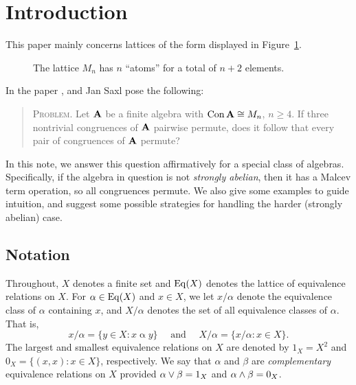 \section{Introduction}
This paper mainly concerns lattices of the form displayed in Figure~\ref{fig:Mn}.
\begin{figure}[!h]
  \caption{The lattice $M_n$ has $n$ ``atoms'' for a total of $n+2$ elements.}
  \label{fig:Mn}
\end{figure}
In the paper \cite{PalfySaxl}, \Peter \Palfy and Jan Saxl pose 
the following: 
\begin{quote}
  {\scshape Problem.}
  Let $\mathbf{A}$ be a finite algebra with $\operatorname{Con} \mathbf{A} \cong M_n$, $n\geq
  4$. If three nontrivial congruences of $\mathbf{A}$ pairwise permute, does it follow
  that every pair of congruences of $\mathbf{A}$ permute?
\end{quote}
In this note, we answer this question affirmatively for a special class of
algebras. 
Specifically, if the algebra in question is not \emph{strongly abelian}, then it has a 
Malcev term operation, so all congruences permute.  
We also give some examples to guide intuition, and suggest some 
possible strategies for handling the harder (strongly abelian) case. 

\subsection{Notation}
Throughout, $X$ denotes a finite set and $\operatorname{Eq}(X)$ denotes the lattice of
equivalence relations on $X$. For $\alpha \in \operatorname{Eq}(X)$ and $x\in X$, we
let $x/\alpha$ denote the equivalence class of $\alpha$ containing $x$, and 
$X/\alpha$ denotes the set of all equivalence classes of $\alpha$. That is,
\[
x/\alpha = \{y\in X : x \mathrel{ \alpha } y\} \quad \text{ and } \quad
X/\alpha = \{x/\alpha : x\in X \}.
\]
The largest and smallest equivalence relations on $X$ are denoted by $1_X = X^2$
and $0_X = \{(x,x) : x \in X\}$, respectively.
We say that $\alpha$ and $\beta$ are \emph{complementary} equivalence relations
on $X$ provided $\alpha \vee \beta = 1_X$ and $\alpha \wedge \beta = 0_X$.


